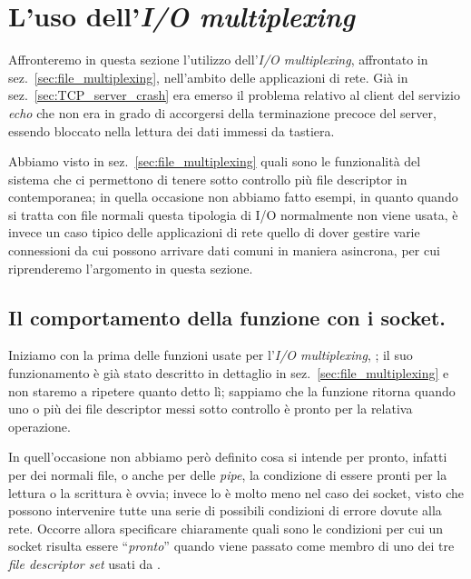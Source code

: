 \section{L'uso dell'\textit{I/O multiplexing}}
\label{sec:TCP_sock_multiplexing}

Affronteremo in questa sezione l'utilizzo dell'\textit{I/O multiplexing},
affrontato in sez.~\ref{sec:file_multiplexing}, nell'ambito delle applicazioni
di rete. Già in sez.~\ref{sec:TCP_server_crash} era emerso il problema
relativo al client del servizio \textit{echo} che non era in grado di
accorgersi della terminazione precoce del server, essendo bloccato nella
lettura dei dati immessi da tastiera.

Abbiamo visto in sez.~\ref{sec:file_multiplexing} quali sono le funzionalità
del sistema che ci permettono di tenere sotto controllo più file descriptor in
contemporanea; in quella occasione non abbiamo fatto esempi, in quanto quando
si tratta con file normali questa tipologia di I/O normalmente non viene
usata, è invece un caso tipico delle applicazioni di rete quello di dover
gestire varie connessioni da cui possono arrivare dati comuni in maniera
asincrona, per cui riprenderemo l'argomento in questa sezione.


\subsection{Il comportamento della funzione  con i socket.}
\label{sec:TCP_sock_select}

Iniziamo con la prima delle funzioni usate per l'\textit{I/O multiplexing},
; il suo funzionamento è già stato descritto in dettaglio in
sez.~\ref{sec:file_multiplexing} e non staremo a ripetere quanto detto lì;
sappiamo che la funzione ritorna quando uno o più dei file descriptor messi
sotto controllo è pronto per la relativa operazione.

In quell'occasione non abbiamo però definito cosa si intende per pronto,
infatti per dei normali file, o anche per delle \textit{pipe}, la condizione
di essere pronti per la lettura o la scrittura è ovvia; invece lo è molto meno
nel caso dei socket, visto che possono intervenire tutte una serie di
possibili condizioni di errore dovute alla rete. Occorre allora specificare
chiaramente quali sono le condizioni per cui un socket risulta essere
``\textsl{pronto}'' quando viene passato come membro di uno dei tre
\textit{file descriptor set} usati da .

